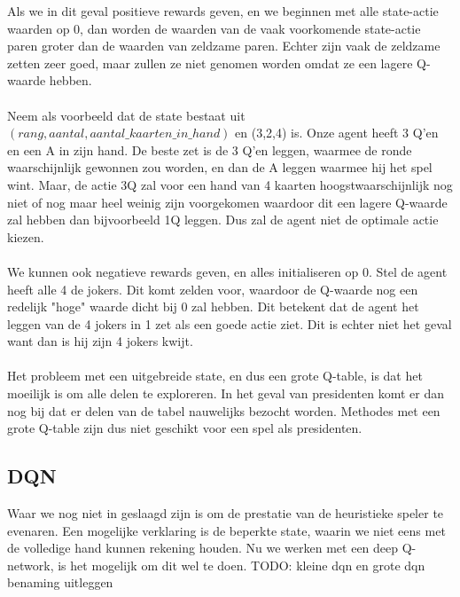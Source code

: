\documentclass[11pt]{article}
\begin{document}
Als we in dit geval positieve rewards geven, en we beginnen met alle state-actie waarden op 0,  dan worden de waarden van de vaak voorkomende state-actie paren groter dan de waarden van zeldzame paren. Echter zijn vaak de zeldzame zetten zeer goed, maar zullen ze niet genomen worden omdat ze een lagere Q-waarde hebben. \\\\
Neem als voorbeeld dat de state bestaat uit $(rang, aantal, aantal\_kaarten\_in\_hand)$ en (3,2,4) is. Onze agent heeft 3 Q'en en een A in zijn hand. De beste zet is de 3 Q'en leggen, waarmee de ronde waarschijnlijk gewonnen zou worden, en dan de A leggen waarmee hij het spel wint. Maar, de actie 3Q zal voor een hand van 4 kaarten hoogstwaarschijnlijk nog niet of nog maar heel weinig zijn voorgekomen waardoor dit een lagere Q-waarde zal hebben dan bijvoorbeeld 1Q leggen. Dus zal de agent niet de optimale actie kiezen.\\\\
We kunnen ook negatieve rewards geven, en alles initialiseren op 0. Stel de agent heeft alle 4 de jokers. Dit komt zelden voor, waardoor de Q-waarde nog een redelijk "hoge" waarde dicht bij 0 zal hebben. Dit betekent dat de agent het leggen van de 4 jokers in 1 zet als een goede actie ziet. Dit is echter niet het geval want dan is hij zijn 4 jokers kwijt.\\\\
Het probleem met een uitgebreide state, en dus een grote Q-table, is dat het moeilijk is om alle delen te exploreren. In het geval van presidenten komt er dan nog bij dat er delen van de tabel nauwelijks bezocht worden. Methodes met een grote Q-table zijn dus niet geschikt voor een spel als presidenten.  

\subsection{DQN}
Waar we nog niet in geslaagd zijn is om de prestatie van de heuristieke speler te evenaren. Een mogelijke verklaring is de beperkte state, waarin we niet eens met de volledige hand kunnen rekening houden. Nu we werken met een deep Q-network, is het mogelijk om dit wel te doen.
TODO: kleine dqn en grote dqn benaming uitleggen
\end{document}
